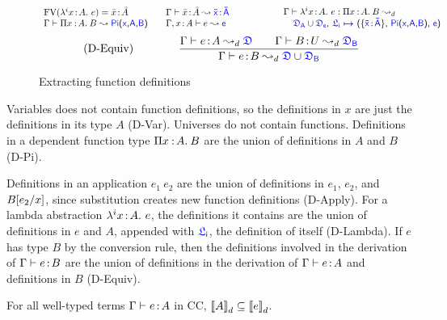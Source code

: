 \begin{figure}[H]
\begin{equation}
{{\begin{array}{l @{\qquad} l}
			   \text{FV}(\lami{i}{x}{A}{e}) = \bar{x} \goodcolon \bar{A} &
			   \Gamma \vdash \bar{x} \goodcolon \bar{A} \leadsto \itemtype{\bar{x}}{\bar{A}} \\
			   \Gamma \vdash \pitype{x}{A}{B} \leadsto \targetpi{x}{A}{B} &
			   \Gamma, x \goodcolon A \vdash e \leadsto \target{e}\\
        	\end{array}}}
			{\begin{array}{c}
			 \Gamma \vdash \lami{i}{x}{A}{e} \mathrel{:} \pitype{x}{A}{B} \leadsto_d \\
			  \qquad \qquad \qquad \target{\fdef_A} \cup \target{\fdef_e} \sfcomma \itemdef{\target{\flabel_i}}{\itemtype{\bar{x}}{\bar{A}}}{\targetpi{x}{A}{B}}{\target{e}}
			 \end{array}
			}
	\end{equation} \vspace{0.5cm}
	\begin{equation}
		\tag{D-Equiv}
		\qquad\qquad
		\frac
			{\Gamma \vdash e \goodcolon A \leadsto_d \target{\fdef} \qquad \Gamma \vdash B \goodcolon U \leadsto_d \target{\fdef_B}}
			{\Gamma \vdash e \goodcolon B \leadsto_d \target{\fdef} \cup \target{\fdef_B}}
	\end{equation}
	\caption{Extracting function definitions}
    \label{fig:dcc def}
\end{figure}

Variables does not contain function definitions, so the definitions in $x$ are just the definitions in its type $A$ (D-Var). Universes do not contain functions. Definitions in a dependent function type $\Pi x\mkern1.5mu{\hspace{0.5mm}{:}\hspace{0.5mm}} A.\hspace{0.8mm}B$ are the union of definitions in $A$ and $B$ (D-Pi). 

Definitions in an application $e_1\ e_2$ are the union of definitions in $e_1$, $e_2$, and $B[e_2\slash x]$, since substitution creates new function definitions (D-Apply). For a lambda abstraction $\lambda^{i}x\hspace{0.5mm}{:}\hspace{0.5mm} A.\ e$, the definitions it contains are the union of definitions in $e$ and $A$, appended with $\target{\flabel_i}$, the definition of itself (D-Lambda).
If $e$ has type $B$ by the conversion rule, then the definitions involved in the derivation of $\Gamma \vdash e \hspace{0.5mm}{:}\hspace{0.5mm} B$ are the union of definitions in the derivation of $\Gamma \vdash e \hspace{0.5mm}{:}\hspace{0.5mm} A$ and definitions in $B$ (D-Equiv).

\begin{lemma} For all well-typed terms $\Gamma \vdash e \hspace{0.5mm}{:}\hspace{0.5mm} A$ in CC, ${[\![ A ]\!]}_d \subseteq {[\![ e ]\!]}_d$.
\label{lem:subset}
\end{lemma}
